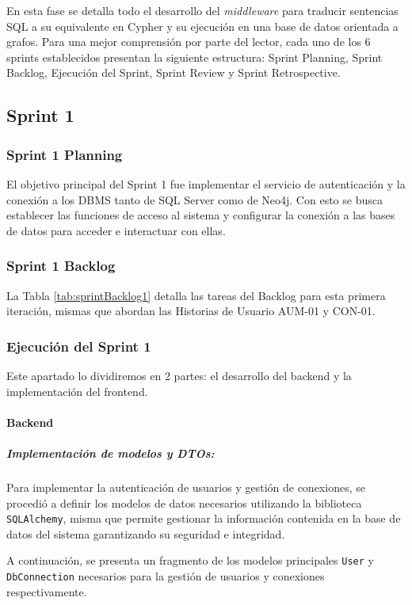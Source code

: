 En esta fase se detalla todo el desarrollo del \textit{middleware} para traducir sentencias SQL a su equivalente en Cypher y su ejecución en una base de datos orientada a grafos. Para una mejor comprensión por parte del lector, cada uno de los 6 sprints establecidos presentan la siguiente estructura: Sprint Planning, Sprint Backlog, Ejecución del Sprint, Sprint Review y Sprint Retrospective.

\subsection{Sprint 1}
\subsubsection{Sprint 1 Planning}
El objetivo principal del Sprint 1 fue implementar el servicio de autenticación y la conexión a los DBMS tanto de SQL Server como de Neo4j. Con esto se busca establecer las funciones de acceso al sistema y configurar la conexión a las bases de datos para acceder e interactuar con ellas.

\subsubsection{Sprint 1 Backlog}
La Tabla \ref{tab:sprintBacklog1} detalla las tareas del Backlog para esta primera iteración, mismas que abordan las Historias de Usuario AUM-01 y CON-01.



\subsubsection{Ejecución del Sprint 1}
Este apartado lo dividiremos en 2 partes: el desarrollo del backend y la implementación del frontend.

\paragraph{Backend}
\subparagraph{Implementación de modelos y DTOs:} Para implementar la autenticación de usuarios y gestión de conexiones, se procedió a definir los modelos de datos necesarios utilizando la biblioteca \texttt{SQLAlchemy}, misma que permite gestionar la información contenida en la base de datos del sistema garantizando su seguridad e integridad.

A continuación, se presenta un fragmento de los modelos principales \texttt{User} y \texttt{DbConnection} necesarios para la gestión de usuarios y conexiones respectivamente.


